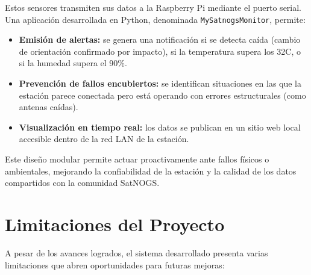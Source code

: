 \documentclass[conference]{IEEEtran}
\begin{document}
Estos sensores transmiten sus datos a la Raspberry Pi mediante el puerto serial. Una aplicación desarrollada en Python, denominada \texttt{MySatnogsMonitor}, permite:

\begin{itemize}
    \item \textbf{Emisión de alertas:} se genera una notificación si se detecta caída (cambio de orientación confirmado por impacto), si la temperatura supera los 32\textdegree C, o si la humedad supera el 90\%.
    \item \textbf{Prevención de fallos encubiertos:} se identifican situaciones en las que la estación parece conectada pero está operando con errores estructurales (como antenas caídas).
    \item \textbf{Visualización en tiempo real:} los datos se publican en un sitio web local accesible dentro de la red LAN de la estación.
\end{itemize}

Este diseño modular permite actuar proactivamente ante fallos físicos o ambientales, mejorando la confiabilidad de la estación y la calidad de los datos compartidos con la comunidad SatNOGS.


\section{Limitaciones del Proyecto}

A pesar de los avances logrados, el sistema desarrollado presenta varias limitaciones que abren oportunidades para futuras mejoras:
\end{document}
